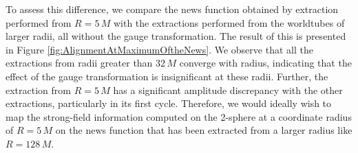 

To assess this difference, we compare the news function obtained by extraction performed from $R=5\,M$ with the extractions performed from the worldtubes of larger radii, all without the gauge transformation. The result of this is presented in Figure \ref{fig:AlignmentAtMaximumOftheNews}. We observe that all the extractions from radii greater than $32\,M$ converge with radius, indicating that the effect of the gauge transformation is insignificant at these radii. Further, the extraction from $R=5\,M$ has a significant amplitude discrepancy with the other extractions, particularly in its first cycle. Therefore, we would ideally wish to map the strong-field information computed on the 2-sphere at a coordinate radius of $R=5\,M$ on the news function that has been extracted from a larger radius like $R=128\,M$. 



